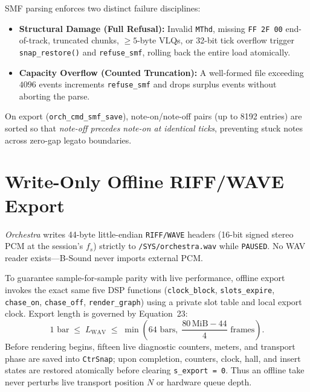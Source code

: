 SMF parsing enforces two distinct failure disciplines:
\begin{itemize}[leftmargin=1.5em]
  \item \textbf{Structural Damage (Full Refusal):} Invalid \texttt{MThd}, missing \texttt{FF 2F 00} end-of-track, truncated chunks, $\ge 5$-byte VLQs, or 32-bit tick overflow trigger \texttt{snap\_restore()} and \texttt{refuse\_smf}, rolling back the entire load atomically.
  \item \textbf{Capacity Overflow (Counted Truncation):} A well-formed file exceeding $4096$ events increments \texttt{refuse\_smf} and drops surplus events without aborting the parse.
\end{itemize}

On export (\texttt{orch\_cmd\_smf\_save}), note-on/note-off pairs (up to 8192 entries) are sorted so that \emph{note-off precedes note-on at identical ticks}, preventing stuck notes across zero-gap legato boundaries.

\section{Write-Only Offline RIFF/WAVE Export}

\emph{Orchestra} writes 44-byte little-endian \texttt{RIFF/WAVE} headers (16-bit signed stereo PCM at the session's $f_s$) strictly to \texttt{/SYS/orchestra.wav} while \texttt{PAUSED}. No WAV reader exists—B-Sound never imports external PCM.

To guarantee sample-for-sample parity with live performance, offline export invokes the exact same five DSP functions (\texttt{clock\_block}, \texttt{slots\_expire}, \texttt{chase\_on}, \texttt{chase\_off}, \texttt{render\_graph}) using a private slot table and local export clock. Export length is governed by Equation~23:
\begin{equation}
\label{eq:wav-bounds}
1\text{ bar} \;\le\; L_{\mathrm{WAV}} \;\le\; \min\!\left(64\text{ bars},\; \frac{80\,\mathrm{MiB} - 44}{4}\text{ frames}\right).
\end{equation}
Before rendering begins, fifteen live diagnostic counters, meters, and transport phase are saved into \texttt{CtrSnap}; upon completion, counters, clock, hall, and insert states are restored atomically before clearing \texttt{s\_export = 0}. Thus an offline take never perturbs live transport position $N$ or hardware queue depth.
